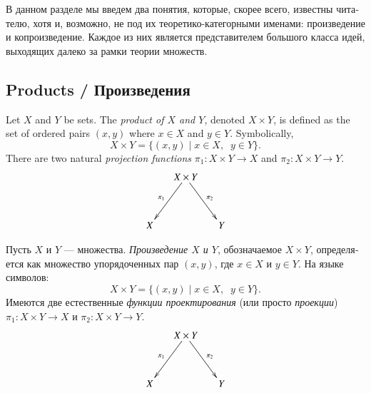 \documentclass[a4paper]{book}
\def\to{\rightarrow}
\def\taking{\colon}
\def\|{{\;|\;}}
\theoremstyle{myth}
\newtheorem{definitionENG}[envENG]{\begin{english}Definition\end{english}}
\newtheorem{definitionRUS}[envRUS]{\begin{russian}Определение\end{russian}}
\begin{document}
\begin{english}
\begin{russian}В данном разделе мы введем два понятия, которые, скорее всего, известны читателю, хотя и, возможно, не под их теоретико-категорными именами: произведение и копроизведение. Каждое из них является представителем большого класса идей, выходящих далеко за рамки теории множеств. \end{russian}


\subsection{Products / Произведения}\label{sec:products}

\begin{definitionENG}
Let $X$ and $Y$ be sets. The {\em product of $X$ and $Y$}, denoted $X\times Y$, is defined as the set of ordered pairs $(x,y)$ where $x\in X$ and $y\in Y$. Symbolically, $$X\times Y=\{(x,y)\|x\in X,\;\; y\in Y\}.$$ There are two natural {\em projection functions} $\pi_1\taking X\times Y\to X$ and $\pi_2\taking X\times Y\to Y$.
$$\xymatrix@=15pt{&X\times Y\ar[ddr]^{\pi_2}\ar[ddl]_{\pi_1}\\\\X&&Y}$$
\end{definitionENG}

\begin{definitionRUS}
\begin{russian}Пусть $X$ и $Y$ — множества. {\em Произведение $X$ и $Y$}, обозначаемое $X\times Y$, определяется как множество упорядоченных пар $(x,y)$, где $x\in X$ и $y\in Y$. На языке символов: $$X\times Y=\{(x,y)\|x\in X,\;\; y\in Y\}.$$ Имеются две естественные {\em функции проектирования} (или просто {\em проекции}) $\pi_1\taking X\times Y\to X$ и $\pi_2\taking X\times Y\to Y$.
$$\xymatrix@=15pt{&X\times Y\ar[ddr]^{\pi_2}\ar[ddl]_{\pi_1}\\\\X&&Y}$$
\end{russian}
\end{definitionRUS}


\end{english}
\end{document}

